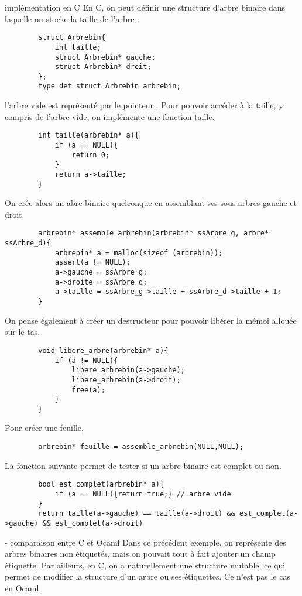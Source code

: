 \begin{exemple}{7.11}{implémentation en C}
    En C, on peut définir une structure d'arbre binaire dans laquelle on stocke la taille de l'arbre :
    \begin{verbatim}
        struct Arbrebin{
            int taille;
            struct Arbrebin* gauche;
            struct Arbrebin* droit;
        };
        type def struct Arbrebin arbrebin;
    \end{verbatim}
    l'arbre vide est représenté par le pointeur . Pour pouvoir accéder à la taille, y compris de l'arbre vide, on implémente une fonction taille.
    \begin{verbatim}
        int taille(arbrebin* a){
            if (a == NULL){
                return 0;
            }
            return a->taille;
        }
    \end{verbatim}
    On crée alors un abre binaire quelconque en assemblant ses sous-arbres gauche et droit. 
    \begin{verbatim}
        arbrebin* assemble_arbrebin(arbrebin* ssArbre_g, arbre* ssArbre_d){
            arbrebin* a = malloc(sizeof (arbrebin));
            assert(a != NULL);
            a->gauche = ssArbre_g;
            a->droite = ssArbre_d;
            a->taille = ssArbre_g->taille + ssArbre_d->taille + 1;
        }
    \end{verbatim}
    On pense également à créer un destructeur pour pouvoir libérer la mémoi allouée sur le tas. 
    \begin{verbatim}
        void libere_arbre(arbrebin* a){
            if (a != NULL){
                libere_arbrebin(a->gauche);
                libere_arbrebin(a->droit);
                free(a);
            }
        }
    \end{verbatim}
    Pour créer une feuille,
    \begin{verbatim}
        arbrebin* feuille = assemble_arbrebin(NULL,NULL);
    \end{verbatim}
    La fonction suivante permet de tester si un arbre binaire est complet ou non.
    \begin{verbatim}
        bool est_complet(arbrebin* a){
            if (a == NULL){return true;} // arbre vide
        }
        return taille(a->gauche) == taille(a->droit) && est_complet(a->gauche) && est_complet(a->droit)
    \end{verbatim}
\end{exemple}

\begin{remarque}{7.12}{ - comparaison entre C et Ocaml}
    Dans ce précédent exemple, on représente des arbres binaires non étiquetés, mais on pouvait tout à fait ajouter un champ étiquette. Par ailleurs, en C, on a naturellement une structure mutable, ce qui permet de modifier la structure d'un arbre ou ses étiquettes. Ce n'est pas le cas en Ocaml.
\end{remarque}

